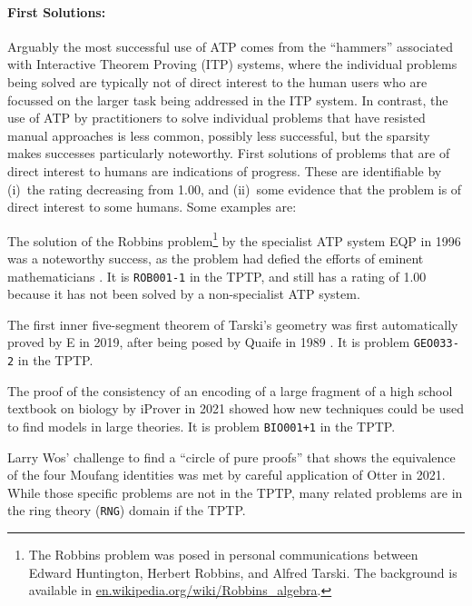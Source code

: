 \documentclass[runningheads]{llncs}
\newenvironment{packed_itemize}{
\vspace*{-0.5em}
\begin{itemize}
\setlength{\partopsep}{0pt}
\setlength{\itemsep}{1pt}
\setlength{\parskip}{0pt}
\setlength{\parsep}{0pt}
}{\end{itemize}}
\begin{document}
\vspace*{-0.5em}
\paragraph{First Solutions:}
Arguably the most successful use of ATP comes from the ``hammers'' \cite{BK+16} associated with 
Interactive Theorem Proving (ITP) systems, where the individual problems being solved are 
typically not of direct interest to the human users who are focussed on the larger task being 
addressed in the ITP system.
In contrast, the use of ATP by practitioners to solve individual problems that have resisted
manual approaches is less common, possibly less successful, but the sparsity makes successes 
particularly noteworthy. 
First solutions of problems that are of direct interest to humans are indications of progress.
These are identifiable by (i)~the rating decreasing from 1.00, and (ii)~some evidence that the 
problem is of direct interest to some humans.
Some examples are:
\begin{packed_itemize}
\item The solution of the Robbins problem\footnote{%
      The Robbins problem was posed in personal communications between Edward Huntington,
      Herbert Robbins, and Alfred Tarski.
      The background is available in 
      \href{https://en.wikipedia.org/wiki/Robbins_algebra}{en.wikipedia.org/wiki/Robbins\_algebra}.}
      by the specialist ATP system EQP \cite{McC97} 
      in 1996 was a noteworthy success, as the problem had defied the efforts of eminent 
      mathematicians \cite{HMT71}.
      It is {\tt ROB001-1} in the TPTP, and still has a rating of 1.00 because it has not
      been solved by a non-specialist ATP system.
\item The first inner five-segment theorem of Tarski's geometry \cite{SST83} was first 
      automatically proved by E \cite{Sch13-LPAR} in 2019, after being posed by Quaife in 
      1989 \cite{Qua89}.
      It is problem {\tt GEO033-2} in the TPTP.
\item The proof of the consistency of an encoding of a large fragment of a high school textbook
      on biology \cite{CDI13} by iProver \cite{Kor08} in 2021 showed how new techniques could
      be used to find models in large theories.
      It is problem {\tt BIO001+1} in the TPTP.
\item Larry Wos' challenge to find a ``circle of pure proofs'' that shows the equivalence
      of the four Moufang identities \cite{Wos19} was met by careful application \cite{Ver22} of
      Otter \cite{McC03-Otter} in 2021.
      While those specific problems are not in the TPTP, many related problems are in the
      ring theory ({\tt RNG}) domain if the TPTP.
\end{packed_itemize}
\end{document}

